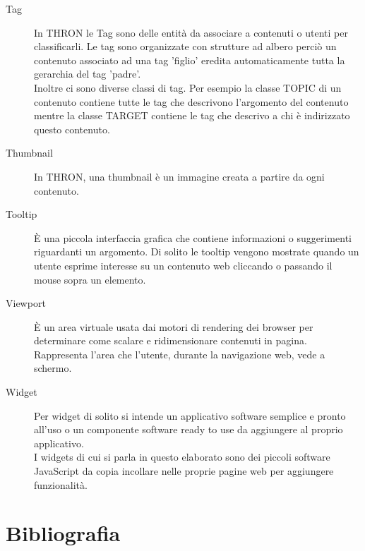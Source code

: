 \documentclass[a4paper, 12pt, twoside, openright]{book}
\begin{document}
\begin {description}
\item[Tag]
In THRON le Tag sono delle entità da associare a contenuti o utenti per classificarli. Le tag sono organizzate con strutture ad albero perciò un contenuto associato ad una tag 'figlio' eredita automaticamente tutta la gerarchia del tag 'padre'.\\
Inoltre ci sono diverse classi di tag. Per esempio la classe TOPIC di un contenuto contiene tutte le tag che descrivono l'argomento del contenuto mentre la classe TARGET contiene le tag che descrivo a chi è indirizzato questo contenuto.
\item[Thumbnail]
In THRON, una thumbnail è un immagine creata a partire da ogni contenuto.
\item[Tooltip]
\`{E} una piccola interfaccia grafica che contiene informazioni o suggerimenti riguardanti un argomento. Di solito le tooltip vengono mostrate quando un utente esprime interesse su un contenuto web cliccando o passando il mouse sopra un elemento.

\item[Viewport]
\`{E} un area virtuale usata dai motori di rendering dei browser per determinare come scalare e ridimensionare contenuti in pagina. Rappresenta l'area che l'utente, durante la navigazione web, vede a schermo.

\item[Widget]
Per widget di solito si intende un applicativo software semplice e pronto all'uso o un componente software ready to use da aggiungere al proprio applicativo.\\
I widgets di cui si parla in questo elaborato sono dei piccoli software JavaScript da copia incollare nelle proprie pagine web per aggiungere funzionalità.


\end{description}

\chapter{Bibliografia}

\thispagestyle{empty}
\end{document}

